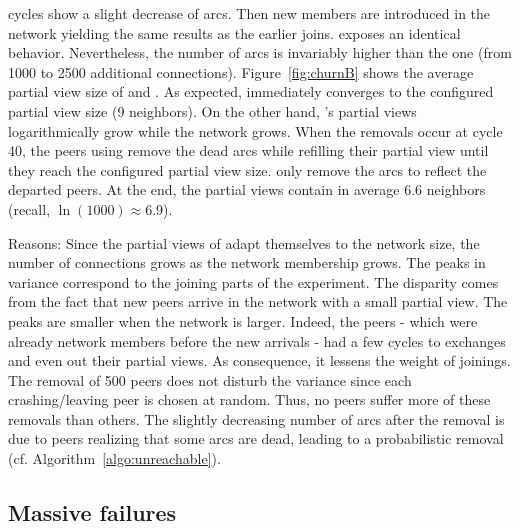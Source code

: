 \begin{asparadesc}
  cycles show a slight decrease of arcs. Then new members are introduced in the
  network yielding the same results as the earlier joins. \CYCLON exposes an
  identical behavior. Nevertheless, the number of arcs is invariably higher
  than the \SPRAY one (from 1000 to 2500 additional
  connections). Figure~\ref{fig:churnB} shows the average partial view size of
  \SPRAY and \CYCLON. As expected, \CYCLON immediately converges to the
  configured partial view size (9 neighbors). On the other hand, \SPRAY's
  partial views logarithmically grow while the network grows. When the removals
  occur at cycle 40, the peers using \CYCLON remove the dead arcs while
  refilling their partial view until they reach the configured partial view
  size. \SPRAY only remove the arcs to reflect the departed peers. At the end,
  the \SPRAY partial views contain in average 6.6 neighbors (recall,
  $\ln(1000)\approx 6.9$).
\item[Reasons:] Since the partial views of \SPRAY adapt themselves to the
  network size, the number of connections grows as the network membership
  grows.  The peaks in variance correspond to the joining parts of the
  experiment. The disparity comes from the fact that new peers arrive in the
  network with a small partial view. The peaks are smaller when the network is
  larger. Indeed, the peers - which were already network members before the new
  arrivals - had a few cycles to exchanges and even out their partial views. As
  consequence, it lessens the weight of joinings. The removal of 500 peers does
  not disturb the variance since each crashing/leaving peer is chosen at
  random. Thus, no peers suffer more of these removals than others. The
  slightly decreasing number of arcs after the removal is due to peers
  realizing that some arcs are dead, leading to a probabilistic removal
  (cf. Algorithm~\ref{algo:unreachable}). 
\end{asparadesc}

\subsection{Massive failures}
\label{subsec:resilience}

